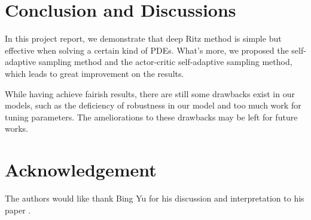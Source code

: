 \documentclass{article}
\begin{document}
\section{Conclusion and Discussions}
\par In this project report, we demonstrate that deep Ritz method is simple but effective when solving a certain kind of PDEs. What's more, we proposed the self-adaptive sampling method and the actor-critic self-adaptive sampling method, which leads to great improvement on the results.
\par While having achieve fairish results, there are still some drawbacks exist in our models, such as the deficiency of robustness in our model and too much work for tuning parameters. The ameliorations to these drawbacks may be left for future works.

\section*{Acknowledgement}
\par The authors would like thank Bing Yu for his discussion and interpretation to his paper \cite{yu2017deep}.





\medskip

\small
\end{document}
